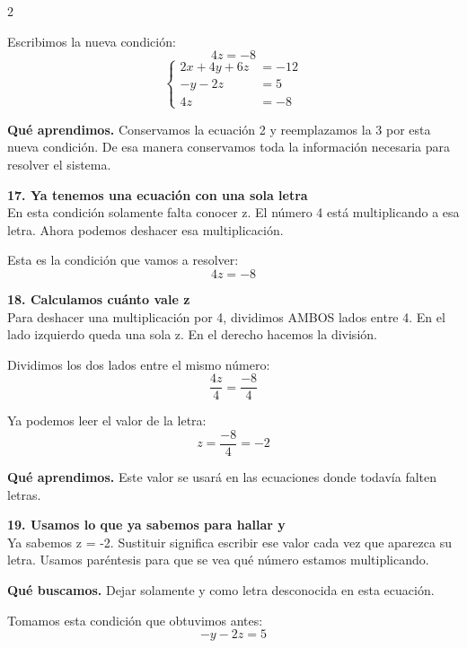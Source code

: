 \documentclass[11pt,a4paper,landscape]{article}
\begin{document}
\begin{multicols*}{2}
\begin{minipage}{\linewidth}
\par\smallskip Escribimos la nueva condición:
\[4z = -8\]
\[\left\{\begin{aligned}2x + 4y + 6z &= -12\\-y - 2z &= 5\\4z &= -8\end{aligned}\right.\]
\par\smallskip\textbf{Qué aprendimos.} Conservamos la ecuación 2 y reemplazamos la 3 por esta nueva condición. De esa manera conservamos toda la información necesaria para resolver el sistema.
\end{minipage}\par\medskip
\noindent\begin{minipage}{\linewidth}\textbf{17. Ya tenemos una ecuación con una sola letra}\\[2pt]En esta condición solamente falta conocer z. El número 4 está multiplicando a esa letra. Ahora podemos deshacer esa multiplicación.
\par\smallskip Esta es la condición que vamos a resolver:
\[4z = -8\]
\end{minipage}\par\medskip
\noindent\begin{minipage}{\linewidth}\textbf{18. Calculamos cuánto vale z}\\[2pt]Para deshacer una multiplicación por 4, dividimos AMBOS lados entre 4. En el lado izquierdo queda una sola z. En el derecho hacemos la división.
\par\smallskip Dividimos los dos lados entre el mismo número:
\[\frac{4z}{4}=\frac{-8}{4}\]
\par\smallskip Ya podemos leer el valor de la letra:
\[z=\frac{-8}{4}=-2\]
\par\smallskip\textbf{Qué aprendimos.} Este valor se usará en las ecuaciones donde todavía falten letras.
\end{minipage}\par\medskip
\noindent\begin{minipage}{\linewidth}\textbf{19. Usamos lo que ya sabemos para hallar y}\\[2pt]Ya sabemos z = -2. Sustituir significa escribir ese valor cada vez que aparezca su letra. Usamos paréntesis para que se vea qué número estamos multiplicando.
\par\smallskip\textbf{Qué buscamos.} Dejar solamente y como letra desconocida en esta ecuación.
\par\smallskip Tomamos esta condición que obtuvimos antes:
\[-y - 2z = 5\]

\end{minipage}
\end{multicols*}
\end{document}
